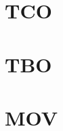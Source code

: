 \documentclass[12pt,a4paper,oneside]{article}
\begin{document}
  \section{TCO}
  

  \section{TBO}
  

  \section{MOV}
  
\end{document}
